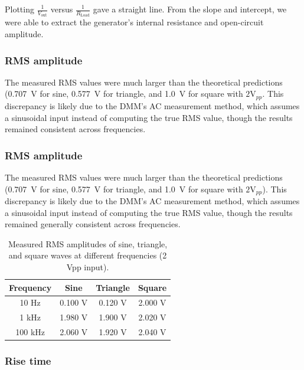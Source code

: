 \documentclass{article}
\begin{document}
\noindent Plotting $\frac{1}{V_\text{out}}$ versus $\frac{1}{R_\text{Load}}$ gave a straight line. From the slope and intercept, we were able to extract the generator's internal resistance and open-circuit amplitude.

\subsubsection{RMS amplitude}

The measured RMS values were much larger than the theoretical predictions (\SI{0.707}{V} for sine, \SI{0.577}{V} for triangle, and \SI{1.0}{V} for square with $2\text{V}_{pp}$. This discrepancy is likely due to the DMM's AC measurement method, which assumes a sinusoidal input instead of computing the true RMS value, though the results remained consistent across frequencies.

\subsubsection{RMS amplitude}

The measured RMS values were much larger than the theoretical predictions (\SI{0.707}{V} for sine, \SI{0.577}{V} for triangle, and \SI{1.0}{V} for square with $2\text{V}_{pp}$). This discrepancy is likely due to the DMM's AC measurement method, which assumes a sinusoidal input instead of computing the true RMS value, though the results remained generally consistent across frequencies.

\begin{table}[H]
    \centering
    \begin{tabular}{ | c c c c | }
        \hline
        Frequency & Sine & Triangle & Square \\
        \hline
        10 Hz   & 0.100 V & 0.120 V & 2.000 V \\
        1 kHz   & 1.980 V & 1.900 V & 2.020 V \\
        100 kHz & 2.060 V & 1.920 V & 2.040 V \\
        \hline
    \end{tabular}
    \caption{Measured RMS amplitudes of sine, triangle, and square waves at different frequencies (2 Vpp input).}
    \label{tab:rms_measurements}
\end{table}

\subsubsection{Rise time}
\end{document}
